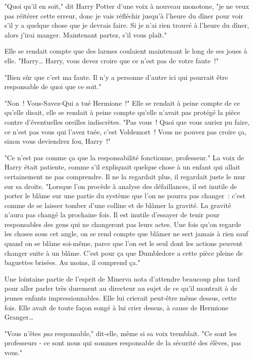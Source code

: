 "Quoi qu'il en soit," dit Harry Potter d'une voix à nouveau monotone, "je ne veux pas réitérer cette erreur, donc je vais réfléchir jusqu'à l'heure du dîner pour voir s'il y a quelque chose que je devrais faire. Si je n'ai rien trouvé à l'heure du dîner, alors j'irai manger. Maintenant partez, s'il vous plaît."

Elle se rendait compte que des larmes coulaient maintenant le long de ses joues à elle. "Harry… Harry, vous devez croire que ce n'est pas de votre faute~!"

"Bien sûr que c'est ma faute. Il n'y a personne d'autre ici qui pourrait être responsable de quoi que ce soit."

"Non~! Vous-Savez-Qui a tué Hermione~!" Elle se rendait à peine compte de ce qu'elle disait, elle se rendait à peine compte qu'elle n'avait pas protégé la pièce contre d'éventuelles oreilles indiscrètes. "Pas vous~! Quoi que vous auriez pu faire, ce n'est pas vous qui l'avez tuée, c'est Voldemort~! Vous ne pouvez pas croire ça, sinon vous deviendrez fou, Harry~!"

"Ce n'est pas comme ça que la responsabilité fonctionne, professeur." La voix de Harry était patiente, comme s'il expliquait quelque chose à un enfant qui allait certainement ne pas comprendre. Il ne la regardait plus, il regardait juste le mur sur sa droite. "Lorsque l'on procède à analyse des défaillances, il est inutile de porter le blâme sur une partie du système que l'on ne pourra pas changer~: c'est comme de se laisser tomber d'une colline et de blâmer la gravité. La gravité n'aura pas changé la prochaine fois. Il est inutile d'essayer de tenir pour responsables des gens qui ne changeront pas leurs actes. Une fois qu'on regarde les choses sous cet angle, on se rend compte que blâmer ne sert jamais à rien sauf quand on se blâme soi-même, parce que l'on est le seul dont les actions peuvent changer suite à un blâme. C'est pour ça que Dumbledore a cette pièce pleine de baguettes brisées. Au moins, il comprend ça."

Une lointaine partie de l'esprit de Minerva nota d'attendre beaucoup plus tard pour aller parler très durement au directeur au sujet de ce qu'il montrait à de jeunes enfants impressionnables. Elle lui crierait peut-être même dessus, cette fois. Elle avait de toute façon songé à lui crier dessus, à cause de Hermione Granger…

"Vous n'êtes \emph{pas} responsable," dit-elle, même si sa voix tremblait. "Ce sont les professeurs - ce sont nous qui sommes responsable de la sécurité des élèves, pas vous."

